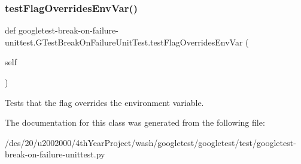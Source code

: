 \subsubsection{\texorpdfstring{test\+Flag\+Overrides\+Env\+Var()}{testFlagOverridesEnvVar()}}
{\footnotesize\ttfamily def googletest-\/break-\/on-\/failure-\/unittest.\+G\+Test\+Break\+On\+Failure\+Unit\+Test.\+test\+Flag\+Overrides\+Env\+Var (\begin{DoxyParamCaption}\item[{}]{self }\end{DoxyParamCaption})}

\begin{DoxyVerb}Tests that the flag overrides the environment variable.\end{DoxyVerb}
 

The documentation for this class was generated from the following file\+:\begin{DoxyCompactItemize}
\item 
/dcs/20/u2002000/4th\+Year\+Project/wash/googletest/googletest/test/googletest-\/break-\/on-\/failure-\/unittest.\+py\end{DoxyCompactItemize}
